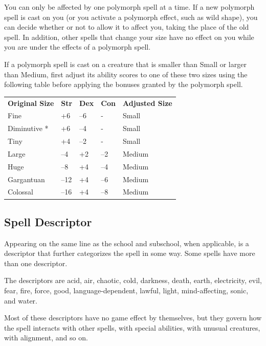 You can only be affected by one polymorph spell at a time. If a new polymorph spell is cast on you (or you activate a polymorph effect, such as wild shape), you can decide whether or not to allow it to affect you, taking the place of the old spell. In addition, other spells that change your size have no effect on you while you are under the effects of a polymorph spell.
				
If a polymorph spell is cast on a creature that is smaller than Small or larger than Medium, first adjust its ability scores to one of these two sizes using the following table before applying the bonuses granted by the polymorph spell.

\begin{table}
\sffamily
 \begin{tabular}{lllll}
\textbf{Original Size} & \textbf{Str} & \textbf{Dex} & \textbf{Con} & \textbf{Adjusted Size}\\
Fine & +6 & --6 & - & Small\\
Diminutive * & +6 & --4 & - & Small\\
Tiny & +4 & --2 & - & Small\\
Large & --4 & +2 & --2 & Medium\\
Huge & --8 & +4 & --4 & Medium\\
Gargantuan & --12 & +4 & --6 & Medium\\
Colossal & --16 & +4 & --8 & Medium\\
 \end{tabular}

\end{table}

				
\subsection{Spell Descriptor}

				
Appearing on the same line as the school and subschool, when applicable, is a descriptor that further categorizes the spell in some way. Some spells have more than one descriptor.
				
The descriptors are acid, air, chaotic, cold, darkness, death, earth, electricity, evil, fear, fire, force, good, language-dependent, lawful, light, mind-affecting, sonic, and water.
				
Most of these descriptors have no game effect by themselves, but they govern how the spell interacts with other spells, with special abilities, with unusual creatures, with alignment, and so on.
				
